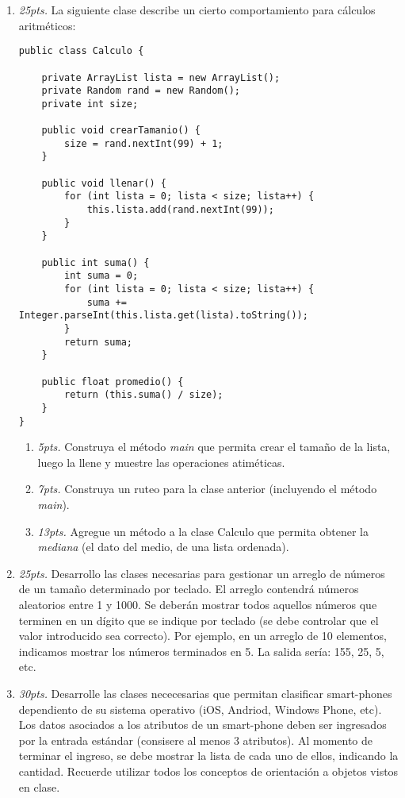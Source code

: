 \documentclass[10pt]{article}
\begin{document}
{\begin{enumerate}
\begin{multicols}{2}
\end{multicols}

\newpage

\item \emph{25pts.} La siguiente clase describe un cierto comportamiento para c\'alculos aritm\'eticos:

\begin{verbatim}
public class Calculo {

    private ArrayList lista = new ArrayList();
    private Random rand = new Random();
    private int size;

    public void crearTamanio() {
        size = rand.nextInt(99) + 1;
    }

    public void llenar() {
        for (int lista = 0; lista < size; lista++) {
            this.lista.add(rand.nextInt(99));
        }
    }

    public int suma() {
        int suma = 0;
        for (int lista = 0; lista < size; lista++) {
            suma += Integer.parseInt(this.lista.get(lista).toString());
        }
        return suma;
    }

    public float promedio() {
        return (this.suma() / size);
    }
}
\end{verbatim}

    \begin{enumerate}[label=(\alph*)]
        \item \emph{5pts.} Construya el m\'etodo \emph{main} que permita crear el tama\~no de la lista, luego la llene y muestre las operaciones atim\'eticas.
        \item \emph{7pts.} Construya un ruteo para la clase anterior (incluyendo el m\'etodo \emph{main}).
        \item \emph{13pts.} Agregue un m\'etodo a la clase Calculo que permita obtener la \emph{mediana} (el dato del medio, de una lista ordenada).
    \end{enumerate}

\newpage

\item \emph{25pts.} Desarrollo las clases necesarias para gestionar un arreglo de n\'umeros de un tama\~no determinado por teclado. El arreglo contendr\'a n\'umeros aleatorios entre 1 y 1000. Se deber\'an mostrar todos aquellos n\'umeros que terminen en un d\'igito que se indique por teclado (se debe controlar que el valor introducido sea correcto). Por ejemplo, en un arreglo de 10 elementos, indicamos mostrar los n\'umeros terminados en 5. La salida ser\'ia: 155, 25, 5, etc.

\newpage

\item \emph{30pts.} Desarrolle las clases nececesarias que permitan clasificar smart-phones dependiento de su sistema operativo (iOS, Andriod, Windows Phone, etc). Los datos asociados a los atributos de un smart-phone deben ser ingresados por la entrada est\'andar (consisere al menos 3 atributos). Al momento de terminar el ingreso, se debe mostrar la lista de cada uno de ellos, indicando la cantidad. Recuerde utilizar todos los conceptos de orientaci\'on a objetos vistos en clase.

\end{enumerate}
}
\end{document}
